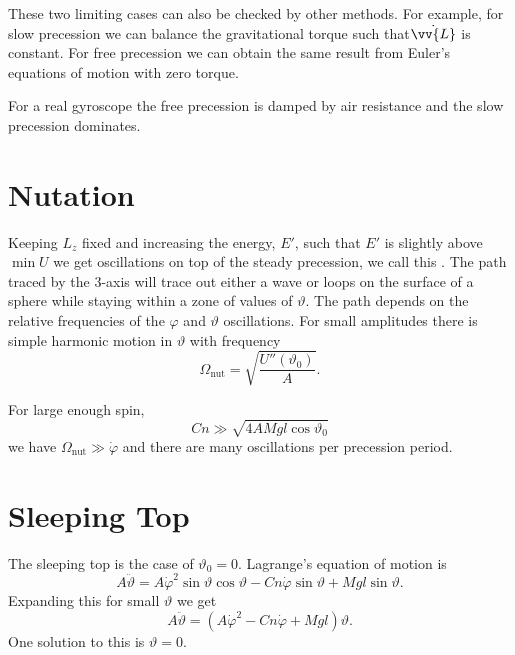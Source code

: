\documentclass[fleqn]{NotesClass}
\begin{document}
    These two limiting cases can also be checked by other methods.
    For example, for slow precession we can balance the gravitational torque such that\(\dot{\vv{L}}\) is constant.
    For free precession we can obtain the same result from Euler's equations of motion with zero torque.
    
    For a real gyroscope the free precession is damped by air resistance and the slow precession dominates.
    
    \section{Nutation}
    Keeping \(L_z\) fixed and increasing the energy, \(E'\), such that \(E'\) is slightly above \(\min U\) we get oscillations on top of the steady precession, we call this .
    The path traced by the \(3\)-axis will trace out either a wave or loops on the surface of a sphere while staying within a zone of values of \(\vartheta\).
    The path depends on the relative frequencies of the \(\varphi\) and \(\vartheta\) oscillations.
    For small amplitudes there is simple harmonic motion in \(\vartheta\) with frequency
    \begin{equation}
        \Omega_{\mathrm{nut}} = \sqrt{\frac{U''(\vartheta_0)}{A}}.
    \end{equation}
    
    For large enough spin,
    \begin{equation}
        Cn \gg \sqrt{4AMgl\cos\vartheta_0}
    \end{equation}
    we have \(\Omega_{\mathrm{nut}} \gg \dot{\varphi}\) and there are many oscillations per precession period.
    
    \section{Sleeping Top}
    The sleeping top is the case of \(\vartheta_0 = 0\).
    Lagrange's equation of motion is
    \begin{equation}
        A\ddot{\vartheta} = A\dot{\varphi}^2\sin\vartheta\cos\vartheta - Cn\dot{\varphi}\sin\vartheta + Mgl\sin\vartheta.
    \end{equation}
    Expanding this for small \(\vartheta\) we get
    \begin{equation}
        A\ddot{\vartheta} = (A\dot{\varphi}^2 - Cn\dot{\varphi} + Mgl)\vartheta.
    \end{equation}
    One solution to this is \(\vartheta = 0\).
    
\end{document}
